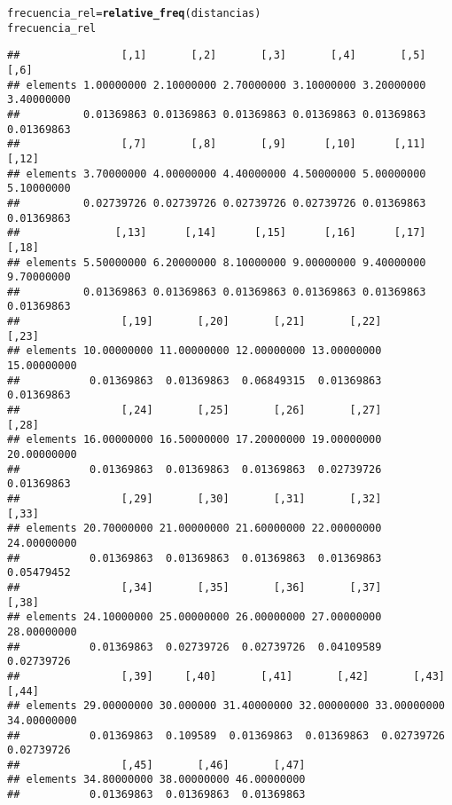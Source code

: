 \documentclass[12pt]{report}\usepackage[]{graphicx}\usepackage[dvipsnames]{xcolor}
\makeatletter
\newcommand{\hlstd}[1]{\textcolor[rgb]{0.345,0.345,0.345}{#1}}%
\newcommand{\hlkwb}[1]{\textcolor[rgb]{0.69,0.353,0.396}{#1}}%
\newcommand{\hlkwd}[1]{\textcolor[rgb]{0.737,0.353,0.396}{\textbf{#1}}}%
\newenvironment{kframe}{%
 \def\at@end@of@kframe{}%
 \ifinner\ifhmode%
  \def\at@end@of@kframe{\end{minipage}}%
  \begin{minipage}{\columnwidth}%
 \fi\fi%
 \def\FrameCommand##1{\hskip\@totalleftmargin \hskip-\fboxsep
 \colorbox{shadecolor}{##1}\hskip-\fboxsep
     \hskip-\linewidth \hskip-\@totalleftmargin \hskip\columnwidth}%
 \MakeFramed {\advance\hsize-\width
   \@totalleftmargin\z@ \linewidth\hsize
   \@setminipage}}%
 {\par\unskip\endMakeFramed%
 \at@end@of@kframe}
\newenvironment{knitrout}{}{} %
\makeatother
\begin{document}
\begin{knitrout}
\color{fgcolor}\begin{kframe}
\begin{alltt}
\hlstd{frecuencia_rel} \hlkwb{=} \hlkwd{relative_freq}\hlstd{(distancias)}
\hlstd{frecuencia_rel}
\end{alltt}
\begin{verbatim}
##                [,1]       [,2]       [,3]       [,4]       [,5]       [,6]
## elements 1.00000000 2.10000000 2.70000000 3.10000000 3.20000000 3.40000000
##          0.01369863 0.01369863 0.01369863 0.01369863 0.01369863 0.01369863
##                [,7]       [,8]       [,9]      [,10]      [,11]      [,12]
## elements 3.70000000 4.00000000 4.40000000 4.50000000 5.00000000 5.10000000
##          0.02739726 0.02739726 0.02739726 0.02739726 0.01369863 0.01369863
##               [,13]      [,14]      [,15]      [,16]      [,17]      [,18]
## elements 5.50000000 6.20000000 8.10000000 9.00000000 9.40000000 9.70000000
##          0.01369863 0.01369863 0.01369863 0.01369863 0.01369863 0.01369863
##                [,19]       [,20]       [,21]       [,22]       [,23]
## elements 10.00000000 11.00000000 12.00000000 13.00000000 15.00000000
##           0.01369863  0.01369863  0.06849315  0.01369863  0.01369863
##                [,24]       [,25]       [,26]       [,27]       [,28]
## elements 16.00000000 16.50000000 17.20000000 19.00000000 20.00000000
##           0.01369863  0.01369863  0.01369863  0.02739726  0.01369863
##                [,29]       [,30]       [,31]       [,32]       [,33]
## elements 20.70000000 21.00000000 21.60000000 22.00000000 24.00000000
##           0.01369863  0.01369863  0.01369863  0.01369863  0.05479452
##                [,34]       [,35]       [,36]       [,37]       [,38]
## elements 24.10000000 25.00000000 26.00000000 27.00000000 28.00000000
##           0.01369863  0.02739726  0.02739726  0.04109589  0.02739726
##                [,39]     [,40]       [,41]       [,42]       [,43]       [,44]
## elements 29.00000000 30.000000 31.40000000 32.00000000 33.00000000 34.00000000
##           0.01369863  0.109589  0.01369863  0.01369863  0.02739726  0.02739726
##                [,45]       [,46]       [,47]
## elements 34.80000000 38.00000000 46.00000000
##           0.01369863  0.01369863  0.01369863
\end{verbatim}
\end{kframe}
\end{knitrout}
			
\end{document}
